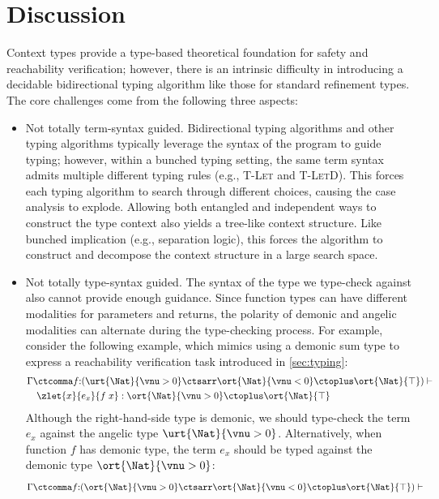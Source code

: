 \section{Discussion}\label{sec:discussion}

Context types provide a type-based theoretical foundation for safety and reachability verification; however, there is an intrinsic difficulty in introducing a decidable bidirectional typing algorithm like those for standard refinement types. The core challenges come from the following three aspects:
\begin{itemize}
    \item Not totally term-syntax guided. Bidirectional typing algorithms and other typing algorithms typically leverage the syntax of the program to guide typing; however, within a bunched typing setting, the same term syntax admits multiple different typing rules (e.g., \textsc{T-Let} and \textsc{T-LetD}). This forces each typing algorithm to search through different choices, causing the case analysis to explode. Allowing both entangled and independent ways to construct the type context also yields a tree-like context structure. Like bunched implication (e.g., separation logic), this forces the algorithm to construct and decompose the context structure in a large search space.
    \item Not totally type-syntax guided. The syntax of the type we type-check against also cannot provide enough guidance. Since function types can have different modalities for parameters and returns, the polarity of demonic and angelic modalities can alternate during the type-checking process.
    For example, consider the following example, which mimics using a demonic sum type to express a reachability verification task introduced in \autoref{sec:typing}:
    \begin{align*}
       &\Gamma \ctcomma f{:}(\urt{\Nat}{\vnu > 0}\ctsarr\ort{\Nat}{\vnu < 0} \ctoplus \ort{\Nat}{\top}) \vdash
       \\&\quad \zlet{x}{e_x}{f\;x} : \ort{\Nat}{\vnu > 0} \ctoplus \ort{\Nat}{\top}
    \end{align*}\noindent
    Although the right-hand-side type is demonic, we should type-check the term $e_x$ against the angelic type $\urt{\Nat}{\vnu > 0}$. 
    Alternatively, when function $f$ has demonic type, the term $e_x$ should be typed against the demonic type $\ort{\Nat}{\vnu > 0}$:
    \begin{align*}
        &\Gamma \ctcomma f{:}(\ort{\Nat}{\vnu > 0}\ctsarr\ort{\Nat}{\vnu < 0} \ctoplus \ort{\Nat}{\top}) \vdash

\end{align*}
\end{itemize}

